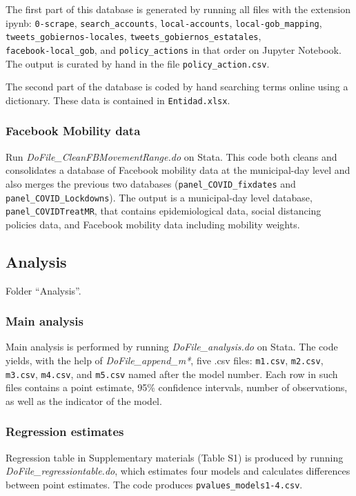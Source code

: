 \documentclass{article}
\begin{document}
The first part of this database is generated by running all files with the extension ipynb: \texttt{0-scrape}, \texttt{search\_accounts}, \texttt{local-accounts}, \texttt{local-gob\_mapping}, \texttt{tweets\_gobiernos-locales}, \texttt{tweets\_gobiernos\_estatales}, \\ \texttt{facebook-local\_gob}, and  \texttt{policy\_actions} in that order on Jupyter Notebook. The output is curated by hand in the file \texttt{policy\_action.csv}.

The second part of the database is coded by hand searching terms online using a dictionary. These data is contained in \texttt{Entidad.xlsx}.

\subsubsection*{Facebook Mobility data}

Run \textit{DoFile\_CleanFBMovementRange.do} on Stata. This code both cleans and consolidates a database of Facebook mobility data at the municipal-day level and also merges the previous two databases (\texttt{panel\_COVID\_fixdates} and \texttt{panel\_COVID\_Lockdowns}). The output is a municipal-day level database, \texttt{panel\_COVIDTreatMR}, that contains epidemiological data, social distancing policies data, and Facebook mobility data including mobility weights.

\subsection*{Analysis}
Folder ``Analysis''.
\subsubsection*{Main analysis}

Main analysis is performed by running \textit{DoFile\_analysis.do} on Stata. The code yields, with the help of \textit{DoFile\_append\_m*}, five .csv files: \texttt{m1.csv}, \texttt{m2.csv}, \texttt{m3.csv}, \texttt{m4.csv}, and \texttt{m5.csv} named after the model number. Each row in such files contains a point estimate, 95\% confidence intervals, number of observations, as well as the indicator of the model. 

\subsubsection*{Regression estimates}

Regression table in Supplementary materials (Table S1) is produced by running \textit{DoFile\_regressiontable.do}, which estimates four models and calculates differences between point estimates. The code produces \texttt{pvalues\_models1-4.csv}.
\end{document}
